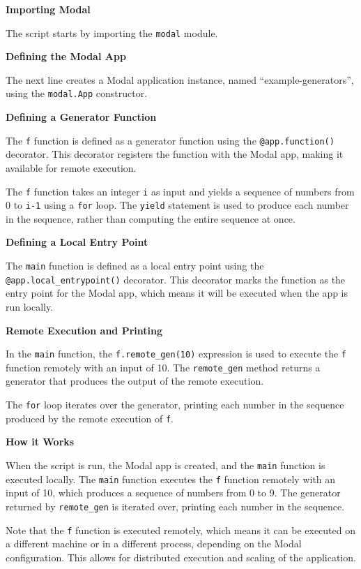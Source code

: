 \documentclass[
  letterpaper,
  DIV=11,
  numbers=noendperiod]{scrreprt}
\begin{document}
\begin{tcolorbox}[enhanced jigsaw, rightrule=.15mm, leftrule=.75mm, coltitle=black, left=2mm, colbacktitle=quarto-callout-tip-color!10!white, colback=white, opacityback=0, toprule=.15mm, toptitle=1mm, colframe=quarto-callout-tip-color-frame, breakable, arc=.35mm, bottomtitle=1mm, title=\textcolor{quarto-callout-tip-color}{\faLightbulb}\hspace{0.5em}{LLaMa 3 70B's interpretation of the code}, titlerule=0mm, bottomrule=.15mm, opacitybacktitle=0.6]

\textbf{Importing Modal}

The script starts by importing the \texttt{modal} module.

\textbf{Defining the Modal App}

The next line creates a Modal application instance, named
``example-generators'', using the \texttt{modal.App} constructor.

\textbf{Defining a Generator Function}

The \texttt{f} function is defined as a generator function using the
\texttt{@app.function()} decorator. This decorator registers the
function with the Modal app, making it available for remote execution.

The \texttt{f} function takes an integer \texttt{i} as input and yields
a sequence of numbers from 0 to \texttt{i-1} using a \texttt{for} loop.
The \texttt{yield} statement is used to produce each number in the
sequence, rather than computing the entire sequence at once.

\textbf{Defining a Local Entry Point}

The \texttt{main} function is defined as a local entry point using the
\texttt{@app.local\_entrypoint()} decorator. This decorator marks the
function as the entry point for the Modal app, which means it will be
executed when the app is run locally.

\textbf{Remote Execution and Printing}

In the \texttt{main} function, the \texttt{f.remote\_gen(10)} expression
is used to execute the \texttt{f} function remotely with an input of 10.
The \texttt{remote\_gen} method returns a generator that produces the
output of the remote execution.

The \texttt{for} loop iterates over the generator, printing each number
in the sequence produced by the remote execution of \texttt{f}.

\textbf{How it Works}

When the script is run, the Modal app is created, and the \texttt{main}
function is executed locally. The \texttt{main} function executes the
\texttt{f} function remotely with an input of 10, which produces a
sequence of numbers from 0 to 9. The generator returned by
\texttt{remote\_gen} is iterated over, printing each number in the
sequence.

Note that the \texttt{f} function is executed remotely, which means it
can be executed on a different machine or in a different process,
depending on the Modal configuration. This allows for distributed
execution and scaling of the application.

\end{tcolorbox}
\end{document}
